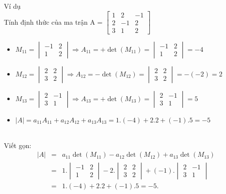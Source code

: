 \documentclass[pdf,10pt]{beamer}
\begin{document}
\begin{frame}{Ví dụ}
	\ \\[-3mm]
	Tính định thức của ma trận A =
	$\begin{bmatrix}
		1 &  2 & -1 \\
		2 & -1 &  2 \\
		3 &  1 &  2 
	\end{bmatrix} $
	
	\begin{itemize}
		\item $M_{11}=
		\begin{vmatrix}
			-1 & 2  \\
			1 & 2  
		\end{vmatrix}
		\Rightarrow A_{11} = + \det(M_{11}) =
		\begin{vmatrix}
			-1 & 2  \\
			1 & 2  
		\end{vmatrix}
		= -4 $
		\item $M_{12}=
		\begin{vmatrix}
			2 & 2  \\
			3 & 2  
		\end{vmatrix}
		\Rightarrow A_{12} = - \det(M_{12}) =
		\begin{vmatrix}
			2 & 2  \\
			3 & 2  
		\end{vmatrix}
		=-(-2)=2
		$
		\item $ M_{13}=
		\begin{vmatrix}
			2 & -1  \\
			3 &  1  
		\end{vmatrix}
		\Rightarrow A_{13} = + \det(M_{13}) =
		\begin{vmatrix}
			2 & -1  \\
			3 &  1  
		\end{vmatrix}
		=5 $
		\item
		$
		|A|=a_{11}A_{11}+a_{12}A_{12}+a_{13}A_{13} = 1.(-4)+2.2+(-1).5=-5
		$
	\end{itemize}\ \\[2mm]
	Viết gọn:
	\begin{eqnarray*}
		|A|  & = & a_{11} \det(M_{11})-a_{12} \det(M_{12}) + a_{13} \det(M_{13}) \\
		& = & 
		1.\begin{vmatrix}
			-1 & 2 \\
			1 &  2  
		\end{vmatrix}
		-2.
		\begin{vmatrix}
			2 & 2  \\
			3 & 2  
		\end{vmatrix}
		+(-1).
		\begin{vmatrix}
			2 & -1  \\
			3 &  1  
		\end{vmatrix}\\
		& = & 1.(-4)+2.2+(-1).5 =-5.
	\end{eqnarray*}
\end{frame}
\end{document}
